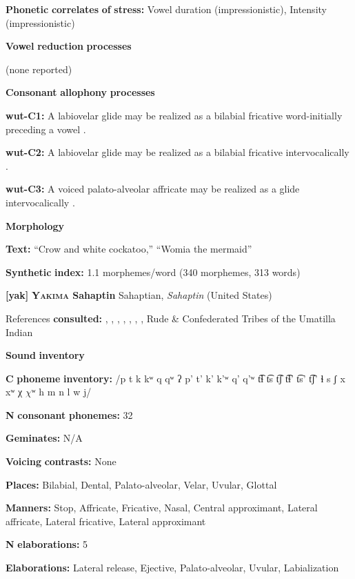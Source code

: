 \textbf{Phonetic} \textbf{correlates} \textbf{of} \textbf{stress:} Vowel duration (impressionistic), Intensity (impressionistic)

\textbf{Vowel} \textbf{reduction} \textbf{processes}

(none reported)

\textbf{Consonant} \textbf{allophony} \textbf{processes}

\textbf{wut-C1:} A labiovelar glide may be realized as a bilabial fricative word-initially preceding a vowel \citep[57-8]{Marmion2010}.

\textbf{wut-C2:} A labiovelar glide may be realized as a bilabial fricative intervocalically \citep[57-8]{Marmion2010}.

\textbf{wut-C3:} A voiced palato-alveolar affricate may be realized as a glide intervocalically \citep[55]{Marmion2010}.

\textbf{Morphology}

\textbf{Text:} “Crow and white cockatoo,” “Womia the mermaid” \citep[378-382]{Marmion2010}

\textbf{Synthetic} \textbf{index:} 1.1 morphemes/word (340 morphemes, 313 words)

\textbf{[yak]}   \textbf{\textsc{Yakima} \textbf{Sahaptin}}  Sahaptian, \textit{Sahaptin} (United States)

References \textbf{consulted:} \citet{HargusBeavert2002}, \citet{HargusBeavert2005}, \citet{HargusBeavert2006}, \citet{Jansen2010}, \citet{Minthorn2005}, \citet{RigsbyRude1996}, \citet{Rude2009}, Rude \& Confederated Tribes of the Umatilla Indian \citet{Reservation2014}

\textbf{Sound} \textbf{inventory}

\textbf{C} \textbf{phoneme} \textbf{inventory:} /p t k kʷ q qʷ ʔ p’ t’ k’ k’ʷ q’ q’ʷ t͡ɬ t͡s t͡ʃ t͡ɬ’ t͡s’ t͡ʃ’ ɬ s ʃ x xʷ χ $\chi ʷ$ h m n l w j/

\textbf{N} \textbf{consonant} \textbf{phonemes:} 32

\textbf{Geminates:} N/A

\textbf{Voicing} \textbf{contrasts:} None

\textbf{Places:} Bilabial, Dental, Palato-alveolar, Velar, Uvular, Glottal

\textbf{Manners:} Stop, Affricate, Fricative, Nasal, Central approximant, Lateral affricate, Lateral fricative, Lateral approximant

\textbf{N} \textbf{elaborations:} 5

\textbf{Elaborations:} Lateral release, Ejective, Palato-alveolar, Uvular, Labialization

